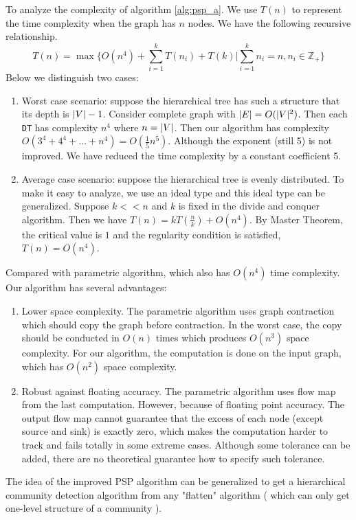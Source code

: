 \documentclass{article}
\begin{document}
To analyze the complexity of algorithm \ref{alg:psp_a}.
We use $T(n)$ to represent the time complexity when the graph has $n$ nodes. We have the following recursive relationship.
\begin{equation}
	T(n) = \max \{ O(n^4) + \sum_{i=1}^k T(n_i) + T(k) | \sum_{i=1}^k n_i = n, n_i \in \mathbb{Z}_{+} \}
\end{equation}	
Below we distinguish two cases:
\begin{enumerate}
\item Worst case scenario: suppose the hierarchical tree has such a structure that its depth is $\lvert V\rvert - 1$. Consider complete graph with $\lvert E\rvert = O(\lvert V\rvert^2)$. Then each \texttt{DT} has complexity $n^4$ where $n = \lvert V\rvert$. Then our algorithm has complexity $O(3^4+4^4 + \dots + n^4) = O(\frac{1}{5} n^5)$. Although the exponent (still 5) is not improved. We have reduced the time complexity by a constant coefficient 5.
\item Average case scenario: suppose the hierarchical tree is evenly distributed. To make it easy to analyze, we use an ideal type and this ideal type can be generalized. Suppose $k << n$ and $k$ is fixed in the divide and conquer algorithm.
Then we have $T(n) = k T(\frac{n}{k}) + O(n^4)$. By Master Theorem, the critical value is $1$ and the regularity condition is satisfied, $T(n) = O(n^4)$. 
\end{enumerate}
Compared with parametric algorithm, which also has $O(n^4)$ time complexity. Our algorithm has several advantages:
\begin{enumerate}
	\item Lower space complexity. The parametric algorithm uses graph contraction which should copy the graph before contraction. In the worst case, the copy should be conducted in $O(n)$ times which produces $O(n^3)$ space complexity.
	For our algorithm, the computation is done on the input graph, which has $O(n^2)$ space complexity.
	\item Robust against floating accuracy. The parametric algorithm uses flow map from the last computation. However, because of floating point accuracy. The output flow map cannot guarantee that the excess of each node (except source and sink) is exactly zero, which makes the computation harder to track and fails totally in some extreme cases. Although some tolerance can be added, there are no theoretical guarantee how to specify such tolerance.
\end{enumerate}
The idea of the improved PSP algorithm can be generalized to get a hierarchical community detection algorithm from any "flatten" algorithm ( which can only get one-level structure of a community ).
\end{document}
